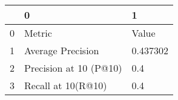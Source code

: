 \begin{tabular}{lll}
\toprule
{} &                       0 &         1 \\
\midrule
0 &                  Metric &     Value \\
1 &       Average Precision &  0.437302 \\
2 &  Precision at 10 (P@10) &       0.4 \\
3 &      Recall at 10(R@10) &       0.4 \\
\bottomrule
\end{tabular}
